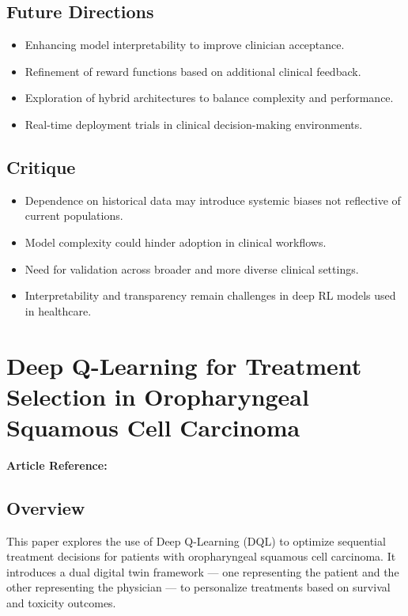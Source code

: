 \subsection*{Future Directions}
\begin{itemize}
    \item Enhancing model interpretability to improve clinician acceptance.
    \item Refinement of reward functions based on additional clinical feedback.
    \item Exploration of hybrid architectures to balance complexity and performance.
    \item Real-time deployment trials in clinical decision-making environments.
\end{itemize}

\subsection*{Critique}
\begin{itemize}
    \item Dependence on historical data may introduce systemic biases not reflective of current populations.
    \item Model complexity could hinder adoption in clinical workflows.
    \item Need for validation across broader and more diverse clinical settings.
    \item Interpretability and transparency remain challenges in deep RL models used in healthcare.
\end{itemize}

\section{Deep Q-Learning for Treatment Selection in Oropharyngeal Squamous Cell Carcinoma}
\textbf{Article Reference:} \cite{tardiniOptimalTreatmentSelection2022}

\subsection*{Overview}
This paper explores the use of Deep Q-Learning (DQL) to optimize sequential treatment decisions for patients with oropharyngeal squamous cell carcinoma. It introduces a dual digital twin framework — one representing the patient and the other representing the physician — to personalize treatments based on survival and toxicity outcomes.

